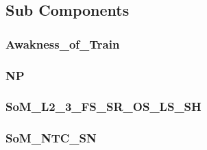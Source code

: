\subsection{Sub Components}\label{s:etcs_procedures_subcomponents}

\subsubsection{Awakness\_of\_Train}


\subsubsection{NP}


\subsubsection{SoM\_L2\_3\_FS\_SR\_OS\_LS\_SH}


\subsubsection{SoM\_NTC\_SN}



